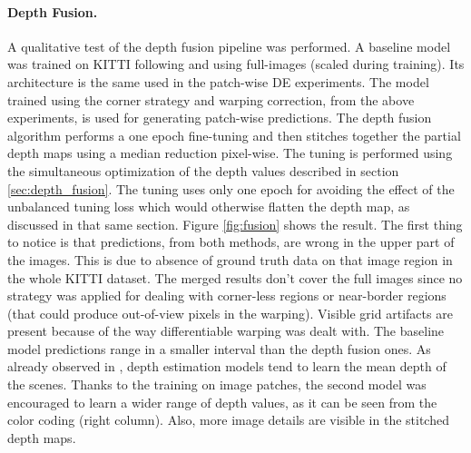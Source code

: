 \paragraph{Depth Fusion.}
A qualitative test of the depth fusion pipeline was performed.
A baseline model was trained on KITTI following \cite{Eigen} and using full-images (scaled during training).
Its architecture is the same used in the patch-wise DE experiments.
The model trained using the corner strategy and warping correction, from the above experiments, is used for generating patch-wise predictions.
The depth fusion algorithm performs a one epoch fine-tuning and then stitches together the partial depth maps using a median reduction pixel-wise.
The tuning is performed using the simultaneous optimization of the depth values described in section \ref{sec:depth_fusion}.
The tuning uses only one epoch for avoiding the effect of the unbalanced tuning loss which would otherwise flatten the depth map, as discussed in that same section.
Figure \ref{fig:fusion} shows the result.
The first thing to notice is that predictions, from both methods, are wrong in the upper part of the images.
This is due to absence of ground truth data on that image region in the whole KITTI dataset.
The merged results don't cover the full images since no strategy was applied for dealing with corner-less regions or near-border regions (that could produce out-of-view pixels in the warping).
Visible grid artifacts are present because of the way differentiable warping was dealt with.
The baseline model predictions range in a smaller interval than the depth fusion ones.
As already observed in \cite{Eigen}, depth estimation models tend to learn the mean depth of the scenes.
Thanks to the training on image patches, the second model was encouraged to learn a wider range of depth values, as it can be seen from the color coding (right column).
Also, more image details are visible in the stitched depth maps.